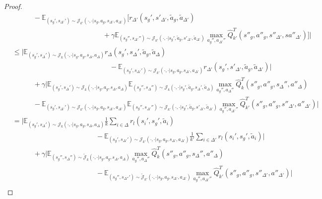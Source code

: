\documentclass{article}
\theoremstyle{plain}
\theoremstyle{definition}
\def\E{\mathbb{E}}
\begin{document}
\begin{proof}
\begin{align*}
&\quad\quad\quad -\E_{(s_g',s_{\Delta'}')\sim{\mathcal{J}_{k'}(\cdot,\cdot|s_g,a_g,s_{\Delta'},a_{\Delta'})}}\bigg[r_{\Delta'}(s_g',s'_{\Delta'},\tilde{a}_g,\tilde{a}_{\Delta'})\\
&\quad\quad\quad\quad\quad\quad\quad\quad\quad\quad\quad\quad\quad+\gamma\E_{(s_g'',s_{\Delta'}'')\sim\mathcal{J}_{k'}(\cdot,\cdot|s_g',\tilde{a}_g,s'_{\Delta'},\tilde{a}_{\Delta'})}\max_{a_g'',a_{\Delta'}''}\hat{Q}_{k'}^{T}(s''_g, {a}''_g,s''_{\Delta'}, s{a}''_{\Delta'})\bigg]\bigg| \\
&\leq \bigg|\E_{(s_g',s_\Delta')\sim{\mathcal{J}_k(\cdot,\cdot|s_g,a_g,s_\Delta,a_\Delta)}} r_\Delta(s_g',s_\Delta',\tilde{a}_g,\tilde{a}_\Delta) \\
&\quad\quad\quad\quad\quad\quad\quad\quad\quad\quad\quad\quad\quad \quad - \E_{(s_g',s_{\Delta'}')\sim{\mathcal{J}_{k'}(\cdot,\cdot|s_g,a_g,s_{\Delta'},a_{\Delta'})}}r_{\Delta'}(s_g',s'_{\Delta'},\tilde{a}_g,\tilde{a}_{\Delta'})\bigg| \\
&\quad\quad\quad+ \gamma\bigg|\E_{(s_g',s_\Delta')\sim{\mathcal{J}_k(\cdot,\cdot|s_g,a_g,s_\Delta,a_\Delta)}}\E_{(s_g'',s_\Delta'')\sim\mathcal{J}_k(\cdot,\cdot|s_g',\tilde{a}_g,s_\Delta',\tilde{a}_\Delta)}\max_{a_g'',a_\Delta''}\hat{Q}_k^{T}(s''_g,{a}''_g,s_\Delta'',{a}''_\Delta) \\
&\quad\quad\quad- \E_{(s_g',s_{\Delta'}')\sim{\mathcal{J}_{k'}(\cdot,\cdot|s_g,a_g,s_{\Delta'},a_{\Delta'})}}\E_{(s_g'',s_{\Delta'}'')\sim\mathcal{J}_{k'}(\cdot,\cdot|s_g',\tilde{a}_g,s'_{\Delta'},\tilde{a}_{\Delta'})}\max_{a_g'',a_{\Delta'}''}\hat{Q}_{k'}^{T}(s''_g, {a}''_g,s''_{\Delta'}, {a}''_{\Delta'})\bigg| \\
&= \bigg|\E_{(s_g',s_\Delta')\sim{\mathcal{J}_k(\cdot,\cdot|s_g,a_g,s_\Delta,a_\Delta)}} \frac{1}{k}\sum_{i\in\Delta}r_l(s_i',s_g',\tilde{a}_i) \\
&\quad\quad\quad\quad\quad\quad\quad\quad\quad\quad\quad\quad- \E_{(s_g',s_{\Delta'}')\sim{\mathcal{J}_{k'}(\cdot,\cdot|s_g,a_g,s_{\Delta'},a_{\Delta'})}}\frac{1}{k'}\sum_{i\in\Delta'}r_l(s_i',s_g',\tilde{a}_i)\bigg| \\
&\quad\quad\quad+ \gamma\bigg|\E_{(s_g'',s_\Delta'')\sim{\tilde{\mathcal{J}}_k(\cdot,\cdot|s_g,a_g,s_\Delta,a_\Delta)}}\max_{a_g'',a_\Delta''}\hat{Q}_k^{T}(s''_g,{a}''_g,s_\Delta'',{a}''_\Delta) \\
&\quad\quad\quad\quad \quad\quad\quad \quad\quad\quad\quad \quad- \E_{(s_g'',s_{\Delta''}')\sim{\tilde{\mathcal{J}}_{k'}(\cdot,\cdot|s_g,a_g,s_{\Delta'},a_{\Delta'})}}\max_{a_g'',a_{\Delta'}''}\hat{Q}_{k'}^{T}(s''_g, {a}''_g,s''_{\Delta'}, {a}''_{\Delta'})\bigg| \\

\end{align*}
\end{proof}
\end{document}
